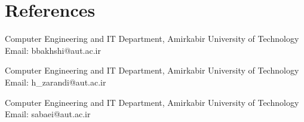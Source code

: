 \documentclass[11pt,a4paper,sans]{moderncv} %
\begin{document}

\section{References}

{Computer Engineering and IT Department, Amirkabir University of Technology\\
Email: bbakhshi@aut.ac.ir
}

{Computer Engineering and IT Department, Amirkabir University of Technology\\
Email: h\_zarandi@aut.ac.ir
}

{Computer Engineering and IT Department, Amirkabir University of Technology\\
	Email: sabaei@aut.ac.ir
}


%
%




\end{document}
